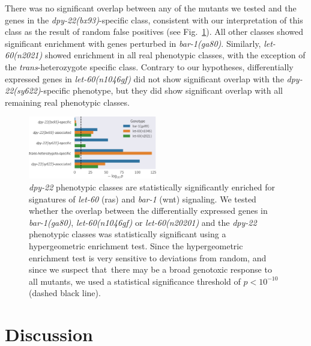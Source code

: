 \documentclass[8pt, twocolumn]{article}
\newcommand{\gene}[1]{\mbox{\emph{#1}}}
\newcommand{\dpy}[1]{\gene{dpy-22#1}}
\newcommand{\bx}{\dpy{(bx93)}}
\newcommand{\sy}{\dpy{(sy622)}}
\begin{document}
There was no significant overlap between any of the mutants we tested and the
genes in the \bx{}-specific class, consistent with our interpretation of this
class as the result of random false positives (see Fig.~\ref{fig:wnt_stps}). All
other classes showed significant enrichment with genes perturbed in
\gene{bar-1(ga80)}. Similarly, \gene{let-60(n2021)} showed enrichment in all
real phenotypic classes, with the exception of the \emph{trans}-heterozygote
specific class. Contrary to our hypotheses, differentially expressed genes in
\gene{let-60(n1046gf)} did not show significant overlap with the \sy{}-specific
phenotype, but they did show significant overlap with all remaining real
phenotypic classes.

\begin{figure}
  \includegraphics[width=0.5\textwidth]{../figs/stp_pvals.pdf}
  \caption{
          \dpy{} phenotypic classes are statistically significantly enriched
          for signatures of \gene{let-60} (ras) and \gene{bar-1} (wnt)
          signaling.
          We tested whether the overlap between the differentially expressed
          genes in \gene{bar-1(ga80)}, \gene{let-60(n1046gf)} or
          \gene{let-60(n20201)} and the \dpy{} phenotypic classes was
          statistically significant using a hypergeometric enrichment test.
          Since the hypergeometric enrichment test is very sensitive to
          deviations from random, and since we suspect that there may be a broad
          genotoxic response to all mutants, we used a statistical significance
          threshold of $p < 10^{-10}$ (dashed black line).
  }
\label{fig:wnt_stps}
\end{figure}

\section*{Discussion}
\label{sec:conclusions}
\end{document}
